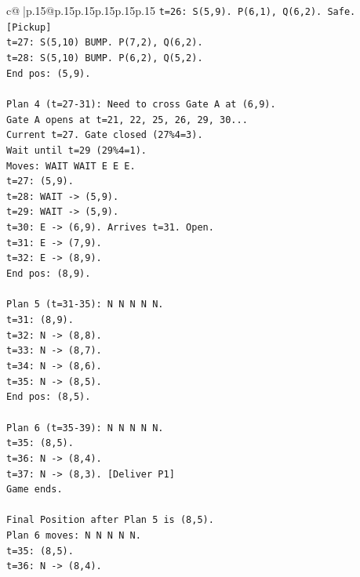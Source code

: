 \documentclass{article}
\begin{document}
{\begin{supertabular}{c@{$\;$}|p{.15\linewidth}@{}p{.15\linewidth}p{.15\linewidth}p{.15\linewidth}p{.15\linewidth}p{.15\linewidth}}
{{{\texttt{t=26: S(5,9). P(6,1), Q(6,2). Safe. {[}Pickup{]}} \\
\texttt{t=27: S(5,10) BUMP. P(7,2), Q(6,2).} \\
\texttt{t=28: S(5,10) BUMP. P(6,2), Q(5,2).} \\
\texttt{End pos: (5,9).} \\
\\ 
\texttt{Plan 4 (t=27{-}31): Need to cross Gate A at (6,9).} \\
\texttt{Gate A opens at t=21, 22, 25, 26, 29, 30...} \\
\texttt{Current t=27. Gate closed (27\%4=3).} \\
\texttt{Wait until t=29 (29\%4=1).} \\
\texttt{Moves: WAIT WAIT E E E.} \\
\texttt{t=27: (5,9).} \\
\texttt{t=28: WAIT {-}> (5,9).} \\
\texttt{t=29: WAIT {-}> (5,9).} \\
\texttt{t=30: E {-}> (6,9). Arrives t=31. Open.} \\
\texttt{t=31: E {-}> (7,9).} \\
\texttt{t=32: E {-}> (8,9).} \\
\texttt{End pos: (8,9).} \\
\\ 
\texttt{Plan 5 (t=31{-}35): N N N N N.} \\
\texttt{t=31: (8,9).} \\
\texttt{t=32: N {-}> (8,8).} \\
\texttt{t=33: N {-}> (8,7).} \\
\texttt{t=34: N {-}> (8,6).} \\
\texttt{t=35: N {-}> (8,5).} \\
\texttt{End pos: (8,5).} \\
\\ 
\texttt{Plan 6 (t=35{-}39): N N N N N.} \\
\texttt{t=35: (8,5).} \\
\texttt{t=36: N {-}> (8,4).} \\
\texttt{t=37: N {-}> (8,3). {[}Deliver P1{]}} \\
\texttt{Game ends.} \\
\\ 
\texttt{Final Position after Plan 5 is (8,5).} \\
\texttt{Plan 6 moves: N N N N N.} \\
\texttt{t=35: (8,5).} \\
\texttt{t=36: N {-}> (8,4).} \\
}}}
\end{supertabular}}
\end{document}
